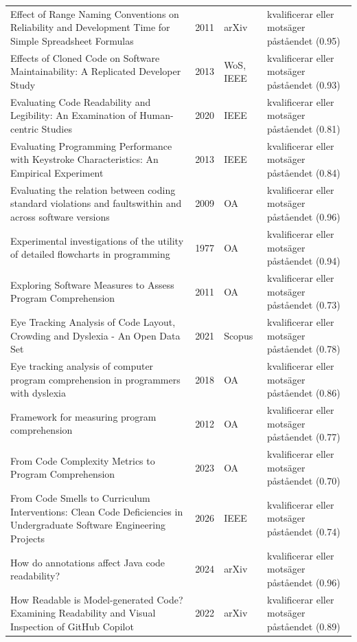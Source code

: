 \begin{longtable}{@{}%
  >{\raggedright\arraybackslash}p{}c%
  >{\raggedright\arraybackslash}p{}%
  >{\raggedright\arraybackslash}p{}@{}}
Effect of Range Naming Conventions on Reliability and Development Time for Simple Spreadsheet Formulas & 2011 & arXiv & kvalificerar eller motsäger påståendet (0.95) \\
Effects of Cloned Code on Software Maintainability: A Replicated Developer Study & 2013 & WoS, IEEE & kvalificerar eller motsäger påståendet (0.93) \\
Evaluating Code Readability and Legibility: An Examination of Human-centric Studies & 2020 & IEEE & kvalificerar eller motsäger påståendet (0.81) \\
Evaluating Programming Performance with Keystroke Characteristics: An Empirical Experiment & 2013 & IEEE & kvalificerar eller motsäger påståendet (0.84) \\
Evaluating the relation between coding standard violations and faultswithin and across software versions & 2009 & OA & kvalificerar eller motsäger påståendet (0.96) \\
Experimental investigations of the utility of detailed flowcharts in programming & 1977 & OA & kvalificerar eller motsäger påståendet (0.94) \\
Exploring Software Measures to Assess Program Comprehension & 2011 & OA & kvalificerar eller motsäger påståendet (0.73) \\
Eye Tracking Analysis of Code Layout, Crowding and Dyslexia - An Open Data Set & 2021 & Scopus & kvalificerar eller motsäger påståendet (0.78) \\
Eye tracking analysis of computer program comprehension in programmers with dyslexia & 2018 & OA & kvalificerar eller motsäger påståendet (0.86) \\
Framework for measuring program comprehension & 2012 & OA & kvalificerar eller motsäger påståendet (0.77) \\
From Code Complexity Metrics to Program Comprehension & 2023 & OA & kvalificerar eller motsäger påståendet (0.70) \\
From Code Smells to Curriculum Interventions: Clean Code Deficiencies in Undergraduate Software Engineering Projects & 2026 & IEEE & kvalificerar eller motsäger påståendet (0.74) \\
How do annotations affect Java code readability? & 2024 & arXiv & kvalificerar eller motsäger påståendet (0.96) \\
How Readable is Model-generated Code? Examining Readability and Visual Inspection of GitHub Copilot & 2022 & arXiv & kvalificerar eller motsäger påståendet (0.89) \\

\end{longtable}
